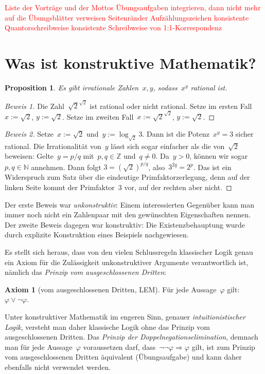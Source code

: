 \documentclass[a4paper,ngerman,12pt]{scrartcl}
\theoremstyle{definition}
\newtheorem{axiom}[defn]{Axiom}
\theoremstyle{plain}
\newtheorem{prop}[defn]{Proposition}
\theoremstyle{remark}
\newcommand{\ZZ}{\mathbb{Z}}
\newcommand{\NN}{\mathbb{N}}
\renewcommand{\_}{\mathpunct{.}\,}
\newcommand{\?}{\,{:}\,}
\newcommand{\XXX}[1]{\textcolor{red}{#1}}
\begin{document}
\tableofcontents

\XXX{Liste der Vorträge und der Mottos}
\XXX{Übungsaufgaben integrieren, dann nicht mehr auf die Übungsblätter
verweisen}
\XXX{Seitenränder}
\XXX{Aufzählungszeichen}
\XXX{konsistente Quantorschreibweise}
\XXX{konsistente Schreibweise von 1:1-Korrespondenz}

\section{Was ist konstruktive Mathematik?}

\begin{prop}Es gibt irrationale Zahlen~$x,y$, sodass~$x^y$ rational ist.
\end{prop}
\begin{proof}[Beweis 1] Die Zahl~$\sqrt{2}^{\sqrt{2}}$ ist rational oder nicht
rational. Setze im ersten Fall~$x := \sqrt{2}$, $y := \sqrt{2}$. Setze im
zweiten Fall~$x := \sqrt{2}^{\sqrt{2}}$, $y := \sqrt{2}$.
\end{proof}
\begin{proof}[Beweis 2] Setze~$x := \sqrt{2}$ und~$y := \log_{\sqrt{2}} 3$.
Dann
ist die Potenz~$x^y = 3$ sicher rational. Die Irrationalität von~$y$ lässt sich
sogar einfacher als die von~$\sqrt{2}$ beweisen:
Gelte~$y = p/q$ mit~$p, q \in \ZZ$ und~$q \neq 0$. Da~$y > 0$, können wir
sogar~$p, q \in \NN$ annehmen.
Dann folgt $3 = (\sqrt{2})^{p/q}$, also~$3^{2q} = 2^p$. Das ist ein
Widerspruch zum Satz über die eindeutige Primfaktorzerlegung, denn auf der linken
Seite kommt der Primfaktor~$3$ vor, auf der rechten aber nicht.
\end{proof}

Der erste Beweis war \emph{unkonstruktiv}: Einem interessierten Gegenüber kann
man immer noch nicht ein Zahlenpaar mit den gewünschten Eigenschaften nennen.
Der zweite Beweis dagegen war konstruktiv: Die Existenzbehauptung wurde durch
explizite Konstruktion eines Beispiels nachgewiesen.

Es stellt sich heraus, dass von den vielen Schlussregeln klassischer Logik genau
ein Axiom für die Zulässigkeit unkonstruktiver Argumente verantwortlich ist,
nämlich das \emph{Prinzip vom ausgeschlossenen Dritten}:
\begin{axiom}[vom ausgeschlossenen Dritten, LEM]Für jede Aussage~$\varphi$ gilt: $\varphi \vee
\neg\varphi$.\end{axiom}
Unter konstruktiver Mathematik im engeren Sinn, genauer
\emph{intuitionistischer Logik}, versteht man daher klassische Logik ohne das
Prinzip vom ausgeschlossenen Dritten.
Das \emph{Prinzip der Doppelnegationselimination}, demnach man für jede
Aussage~$\varphi$ voraussetzen darf, dass~$\neg\neg\varphi \Rightarrow \varphi$
gilt, ist zum Prinzip vom ausgeschlossenen Dritten äquivalent (Übungsaufgabe) und kann daher ebenfalls nicht
verwendet werden.
\end{document}
